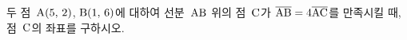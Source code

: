 두 점~$\mathrm{A}(5,\mkern3mu 2)$, $\mathrm{B}(1,\mkern3mu 6)$에 대하여 선분~$\mathrm{AB}$ 위의 점~$\mathrm{C}$가 $\overline{\mathrm{AB}}=4\overline{\mathrm{AC}}$를 만족시킬 때, 점~$\mathrm{C}$의 좌표를 구하시오.
